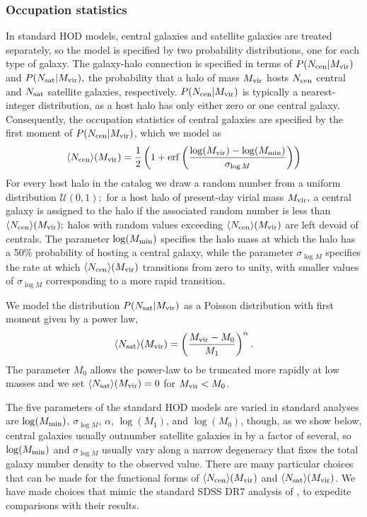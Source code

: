 \documentclass[usenatbib,usegraphicx,letterpaper]{mn2e}
\newcommand{\mvir}{M_{\rm vir}}
\newcommand{\ncen}{N_{\rm cen}}
\newcommand{\nsat}{N_{\rm sat}}
\begin{document}
\subsubsection{Occupation statistics}

In standard HOD models, central galaxies and satellite galaxies are treated separately, so 
the model is specified by two probability distributions, one for each type of galaxy. 
The galaxy-halo connection is specified in terms of $P(\ncen|\mvir)$ and $P(\nsat|\mvir),$ 
the probability that a halo of mass $\mvir$ hosts $\ncen$ central and $\nsat$ satellite galaxies, 
respectively. $P(\ncen|\mvir)$ is typically a nearest-integer distribution, as a host halo has only 
either zero or one central galaxy. Consequently, the occupation statistics of central galaxies are 
specified by the first moment of $P(\ncen|\mvir)$, which we model as 
%
\begin{equation}
\label{eq:ncen}
\langle N_{\mathrm{cen}} \rangle(\mvir) =
        \frac{1}{2}\left( 1 +
        \mathrm{erf}\left( \frac{\log (\mvir) -
        \log (M_{\rm min})}{\sigma_{\log M}} \right) \right)
\end{equation}
%
For every host halo in the catalog we draw a random number from a uniform distribution $\mathcal{U}(0, 1);$ for a host halo of present-day virial mass $\mvir,$ a central galaxy is assigned to the halo if the associated random number is less than $\langle N_{\mathrm{cen}} \rangle(\mvir);$ halos with random values exceeding  $\langle N_{\mathrm{cen}} \rangle(\mvir)$ are left devoid of centrals. 
The parameter $\log (M_{\rm min})$ specifies the halo mass at which the halo has a 50\% probability of hosting a 
central galaxy, while the parameter $\sigma_{\log M}$ specifies the rate at which $\langle N_{\mathrm{cen}} \rangle (\mvir)$ 
transitions from zero to unity, with smaller values of $\sigma_{\log M}$ corresponding to a more rapid transition. 


We model the distribution $P(\nsat|\mvir)$ as a Poisson distribution with first moment given by a power law, 
%
\begin{equation}
\label{eq:nsat}
\langle N_{\rm sat}\rangle(\mvir) = \left( \frac{\mvir - M_0}{M_1} \right)^{\alpha}. 
\end{equation}
%
The parameter $M_0$ allows the power-law to be truncated more rapidly at low masses and we 
set $\langle N_{\rm sat}\rangle (\mvir) = 0$ for $\mvir < M_0$. 


The five parameters of the standard HOD models are varied in standard analyses are $\log (M_{\rm min})$, 
$\sigma_{\log M}$, $\alpha$, $\log (M_1)$, and $\log (M_0)$, though, as we show below, central galaxies usually 
outnumber satellite galaxies in by a factor of several, so $\log (M_{\rm min})$ and $\sigma_{\log M}$ usually 
vary along a narrow degeneracy that fixes the total galaxy number density to the observed value. There are 
many particular choices that can be made for the functional forms of $\langle N_{\rm cen}\rangle (\mvir)$ and 
$\langle N_{\rm sat}\rangle (\mvir)$. We have made choices that mimic the standard SDSS DR7 analysis of 
\citet{zehavi_etal11}, to expedite comparisons with their results.
\end{document}
